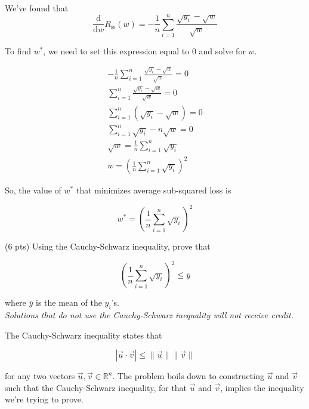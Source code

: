 \documentclass[11pt]{article}
\begin{document}
\begin{prob}[(20 pts)]
\begin{subprob}
\emptybox{7cm}

\begin{solution}
We've found that $$\frac{\text{d}}{\text{d}w} R_\text{ss}(w) = -\frac{1}{n} \sum_{i=1}^n \frac{\sqrt{y_i} - \sqrt{w}}{\sqrt{w}}$$

To find $w^*$, we need to set this expression equal to 0 and solve for $w$.

\begin{align*}
  -\frac{1}{n} \sum_{i=1}^n \frac{\sqrt{y_i} - \sqrt{w}}{\sqrt{w}} = 0 \\
  \sum_{i=1}^n \frac{\sqrt{y_i} - \sqrt{w}}{\sqrt{w}} = 0 \\
  \sum_{i=1}^n (\sqrt{y_i} - \sqrt{w}) = 0 \\
  \sum_{i=1}^n \sqrt{y_i} - n \sqrt{w} = 0 \\
  \sqrt{w} = \frac{1}{n} \sum_{i=1}^n \sqrt{y_i} \\
  w = \left( \frac{1}{n} \sum_{i=1}^n \sqrt{y_i} \right)^2
\end{align*}

So, the value of $w^*$ that minimizes average sub-squared loss is

$$\boxed{w^* = \left( \frac{1}{n} \sum_{i=1}^n \sqrt{y_i} \right)^2}$$

\end{solution}

\end{subprob}

\newpage

\begin{subprob}(6 pts) Using the Cauchy-Schwarz inequality, prove that

$$\left( \frac{1}{n} \sum_{i=1}^n \sqrt{y_i} \right)^2 \leq \bar{y}$$

where $\bar{y}$ is the mean of the $y_i$'s. \\

\textit{Solutions that do not use the Cauchy-Schwarz inequality will not receive credit.}

\emptybox{14cm}

\begin{solution}
The Cauchy-Schwarz inequality states that

$$\left| \vec u \cdot \vec v \right| \leq \lVert \vec u \rVert \lVert \vec v \rVert$$

for any two vectors $\vec u, \vec v \in \mathbb{R}^n$. The problem boils down to constructing $\vec u$ and $\vec v$ such that the Cauchy-Schwarz inequality, for that $\vec u$ and $\vec v$, implies the inequality we're trying to prove. \\


\end{solution}
\end{subprob}
\end{prob}
\end{document}
